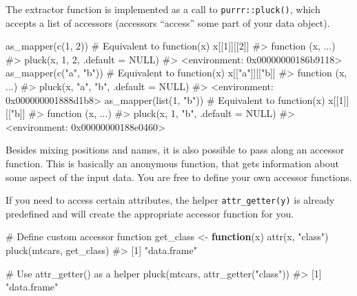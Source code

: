\documentclass[
]{krantz}
\makeatletter
\newenvironment{Shaded}{\begin{snugshade}}{\end{snugshade}}
\newcommand{\CommentTok}[1]{\textcolor[rgb]{0.56,0.35,0.01}{\textit{#1}}}
\newcommand{\ControlFlowTok}[1]{\textcolor[rgb]{0.13,0.29,0.53}{\textbf{#1}}}
\newcommand{\DecValTok}[1]{\textcolor[rgb]{0.00,0.00,0.81}{#1}}
\newcommand{\KeywordTok}[1]{\textcolor[rgb]{0.13,0.29,0.53}{\textbf{#1}}}
\newcommand{\NormalTok}[1]{#1}
\newcommand{\StringTok}[1]{\textcolor[rgb]{0.31,0.60,0.02}{#1}}
\newenvironment{kframe}{%
\medskip{}
\setlength{\fboxsep}{.8em}
 \def\at@end@of@kframe{}%
 \ifinner\ifhmode%
  \def\at@end@of@kframe{\end{minipage}}%
  \begin{minipage}{\columnwidth}%
 \fi\fi%
 \def\FrameCommand##1{\hskip\@totalleftmargin \hskip-\fboxsep
 \colorbox{shadecolor}{##1}\hskip-\fboxsep
     \hskip-\linewidth \hskip-\@totalleftmargin \hskip\columnwidth}%
 \MakeFramed {\advance\hsize-\width
   \@totalleftmargin\z@ \linewidth\hsize
   \@setminipage}}%
 {\par\unskip\endMakeFramed%
 \at@end@of@kframe}
\renewenvironment{Shaded}{\begin{kframe}}{\end{kframe}}
\renewcommand{\KeywordTok} [1]{\textcolor[rgb]{0.00,0.44,0.13}{{#1}}}
\renewcommand{\DecValTok}  [1]{\textcolor[rgb]{0.25,0.63,0.44}{{#1}}}
\renewcommand{\StringTok}  [1]{\textcolor[rgb]{0.25,0.44,0.63}{{#1}}}
\renewcommand{\CommentTok} [1]{\textcolor[rgb]{0.38,0.63,0.69}{{#1}}}
\renewcommand{\NormalTok}  [1]{{#1}}
\makeatother
\begin{document}
The extractor function is implemented as a call to \texttt{purrr::pluck()}, which accepts a list of accessors (accessors ``access'' some part of your data object).

\begin{Shaded}
\begin{Highlighting}[]
\KeywordTok{as_mapper}\NormalTok{(}\KeywordTok{c}\NormalTok{(}\DecValTok{1}\NormalTok{, }\DecValTok{2}\NormalTok{))  }\CommentTok{# Equivalent to function(x) x[[1]][[2]]}
\CommentTok{#> function (x, ...) }
\CommentTok{#> pluck(x, 1, 2, .default = NULL)}
\CommentTok{#> <environment: 0x00000000186b9118>}
\KeywordTok{as_mapper}\NormalTok{(}\KeywordTok{c}\NormalTok{(}\StringTok{"a"}\NormalTok{, }\StringTok{"b"}\NormalTok{))  }\CommentTok{# Equivalent to function(x) x[["a"]][["b]]}
\CommentTok{#> function (x, ...) }
\CommentTok{#> pluck(x, "a", "b", .default = NULL)}
\CommentTok{#> <environment: 0x000000001888d1b8>}
\KeywordTok{as_mapper}\NormalTok{(}\KeywordTok{list}\NormalTok{(}\DecValTok{1}\NormalTok{, }\StringTok{"b"}\NormalTok{))  }\CommentTok{# Equivalent to function(x) x[[1]][["b]]}
\CommentTok{#> function (x, ...) }
\CommentTok{#> pluck(x, 1, "b", .default = NULL)}
\CommentTok{#> <environment: 0x00000000188e0460>}
\end{Highlighting}
\end{Shaded}

Besides mixing positions and names, it is also possible to pass along an accessor function. This is basically an anonymous function, that gets information about some aspect of the input data. You are free to define your own accessor functions.

If you need to access certain attributes, the helper \texttt{attr\_getter(y)} is already predefined and will create the appropriate accessor function for you.

\begin{Shaded}
\begin{Highlighting}[]
\CommentTok{# Define custom accessor function}
\NormalTok{get_class <-}\StringTok{ }\ControlFlowTok{function}\NormalTok{(x) }\KeywordTok{attr}\NormalTok{(x, }\StringTok{"class"}\NormalTok{)}
\KeywordTok{pluck}\NormalTok{(mtcars, get_class)}
\CommentTok{#> [1] "data.frame"}

\CommentTok{# Use attr_getter() as a helper}
\KeywordTok{pluck}\NormalTok{(mtcars, }\KeywordTok{attr_getter}\NormalTok{(}\StringTok{"class"}\NormalTok{))}
\CommentTok{#> [1] "data.frame"}
\end{Highlighting}
\end{Shaded}
\end{document}
